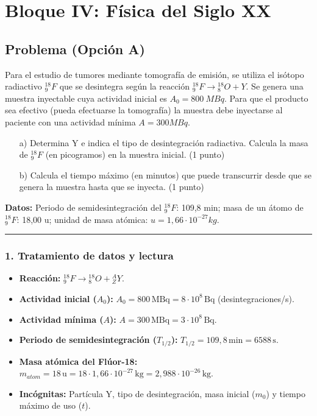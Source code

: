 \newpage

\section{Bloque IV: Física del Siglo XX}
\label{sec:moderna_2016_jun_ord}

\subsection{Problema (Opción A)}
\label{subsec:A5_2016_jun_ord_re}

\begin{cajaenunciado}
Para el estudio de tumores mediante tomografía de emisión, se utiliza el isótopo radiactivo ${}_{9}^{18}F$ que se desintegra según la reacción ${}_{9}^{18}F\rightarrow{}_{8}^{18}O+Y$. Se genera una muestra inyectable cuya actividad inicial es $A_{0}=800~MBq$. Para que el producto sea efectivo (pueda efectuarse la tomografía) la muestra debe inyectarse al paciente con una actividad mínima $A = 300 MBq$.
\begin{enumerate}
    \item[a)] Determina Y e indica el tipo de desintegración radiactiva. Calcula la masa de ${}_{9}^{18}F$ (en picogramos) en la muestra inicial. (1 punto)
    \item[b)] Calcula el tiempo máximo (en minutos) que puede transcurrir desde que se genera la muestra hasta que se inyecta. (1 punto)
\end{enumerate}
\textbf{Datos:} Periodo de semidesintegración del ${}_{9}^{18}F$: 109,8 min; masa de un átomo de ${}_{9}^{18}F$: 18,00 u; unidad de masa atómica: $u=1,66\cdot10^{-27}kg$.
\end{cajaenunciado}
\hrule

\subsubsection*{1. Tratamiento de datos y lectura}
\begin{itemize}
    \item \textbf{Reacción:} ${}_{9}^{18}F\rightarrow{}_{8}^{18}O+{}_{Z}^{A}Y$.
    \item \textbf{Actividad inicial ($A_0$):} $A_0 = 800\,\text{MBq} = 8\cdot10^8\,\text{Bq}$ (desintegraciones/s).
    \item \textbf{Actividad mínima ($A$):} $A = 300\,\text{MBq} = 3\cdot10^8\,\text{Bq}$.
    \item \textbf{Periodo de semidesintegración ($T_{1/2}$):} $T_{1/2} = 109,8\,\text{min} = 6588\,\text{s}$.
    \item \textbf{Masa atómica del Flúor-18:} $m_{atom} = 18\,\text{u} = 18 \cdot 1,66\cdot10^{-27}\,\text{kg} = 2,988\cdot10^{-26}\,\text{kg}$.
    \item \textbf{Incógnitas:} Partícula Y, tipo de desintegración, masa inicial ($m_0$) y tiempo máximo de uso ($t$).
\end{itemize}

